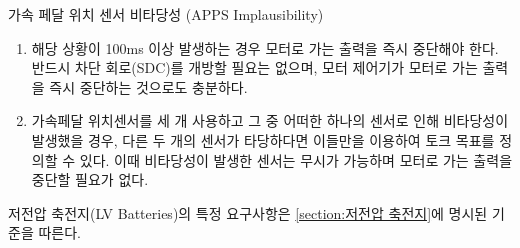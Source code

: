 \documentclass[final,a4paper,10pt]{report}
\begin{document}
\begin{enumerate}
  {\color{blue}
  \item\label{rule:formula-technical.components.apps-implausibility} 가속 페달 위치 센서 비타당성 (APPS Implausibility) \label{item:가속 페달 위치 센서 비타당성}
    \begin{enumerate}
      \item\label{rule:formula-technical.components.apps-implausibility.cutoff-after-100ms} 해당 상황이 100ms 이상 발생하는 경우 모터로 가는 출력을 즉시 중단해야 한다. 반드시 차단 회로(SDC)를 개방할 필요는 없으며, 모터 제어기가 모터로 가는 출력을 즉시 중단하는 것으로도 충분하다.
      \item\label{rule:formula-technical.components.apps-implausibility.triple-sensor-majority-vote} 가속페달 위치센서를 세 개 사용하고 그 중 어떠한 하나의 센서로 인해 비타당성이 발생했을 경우, 다른 두 개의 센서가 타당하다면 이들만을 이용하여 토크 목표를 정의할 수 있다. 이때 비타당성이 발생한 센서는 무시가 가능하며 모터로 가는 출력을 중단할 필요가 없다.
    \end{enumerate}
  }

  \item\label{rule:formula-technical.components.lv-battery-external-reference} 저전압 축전지(LV Batteries)의 특정 요구사항은 \ref{section:저전압 축전지}에 명시된 기준을 따른다.
\end{enumerate}
\end{document}
